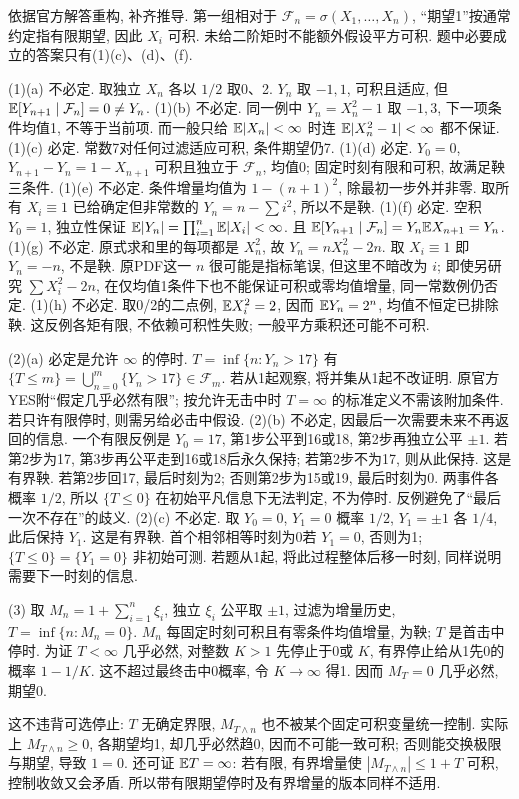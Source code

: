 \begin{solution}
依据官方解答重构, 补齐推导. 第一组相对于 $\mathcal F_n=\sigma(X_1,\ldots,X_n)$, ``期望1''按通常约定指有限期望, 因此 $X_i$ 可积. 未给二阶矩时不能额外假设平方可积. 题中必要成立的答案只有(1)(c)、(d)、(f).

(1)(a)\label{sol:flp-V-1-a} 不必定. 取独立 $X_n$ 各以 $1/2$ 取0、2. $Y_n$ 取 $-1,1$, 可积且适应, 但 $\mathbb E[Y_{n+1}\mid\mathcal F_n]=0\ne Y_n$.
(1)(b)\label{sol:flp-V-1-b} 不必定. 同一例中 $Y_n=X_n^2-1$ 取 $-1,3$, 下一项条件均值1, 不等于当前项. 而一般只给 $\mathbb E|X_n|<\infty$ 时连 $\mathbb E|X_n^2-1|<\infty$ 都不保证.
(1)(c)\label{sol:flp-V-1-c} 必定. 常数7对任何过滤适应可积, 条件期望仍7.
(1)(d)\label{sol:flp-V-1-d} 必定. $Y_0=0$, $Y_{n+1}-Y_n=1-X_{n+1}$ 可积且独立于 $\mathcal F_n$, 均值0; 固定时刻有限和可积, 故满足鞅三条件.
(1)(e)\label{sol:flp-V-1-e} 不必定. 条件增量均值为 $1-(n+1)^2$, 除最初一步外并非零. 取所有 $X_i\equiv1$ 已给确定但非常数的 $Y_n=n-\sum i^2$, 所以不是鞅.
(1)(f)\label{sol:flp-V-1-f} 必定. 空积 $Y_0=1$, 独立性保证 $\mathbb E|Y_n|=\prod_{i=1}^n\mathbb E|X_i|<\infty$. 且 $\mathbb E[Y_{n+1}\mid\mathcal F_n]=Y_n\mathbb E X_{n+1}=Y_n$.
(1)(g)\label{sol:flp-V-1-g} 不必定. 原式求和里的每项都是 $X_n^2$, 故 $Y_n=nX_n^2-2n$. 取 $X_i\equiv1$ 即 $Y_n=-n$, 不是鞅. 原PDF这一 $n$ 很可能是指标笔误, 但这里不暗改为 $i$; 即使另研究 $\sum X_i^2-2n$, 在仅均值1条件下也不能保证可积或零均值增量, 同一常数例仍否定.
(1)(h)\label{sol:flp-V-1-h} 不必定. 取0/2的二点例, $\mathbb E X_i^2=2$, 因而 $\mathbb E Y_n=2^n$, 均值不恒定已排除鞅. 这反例各矩有限, 不依赖可积性失败; 一般平方乘积还可能不可积.

(2)(a)\label{sol:flp-V-2-a} 必定是允许 $\infty$ 的停时. $T=\inf\{n:Y_n>17\}$ 有 $\{T\leq m\}=\bigcup_{n=0}^m\{Y_n>17\}\in\mathcal F_m$. 若从1起观察, 将并集从1起不改证明. 原官方YES附``假定几乎必然有限''; 按允许无击中时 $T=\infty$ 的标准定义不需该附加条件. 若只许有限停时, 则需另给必击中假设.
(2)(b)\label{sol:flp-V-2-b} 不必定, 因最后一次需要未来不再返回的信息. 一个有限反例是 $Y_0=17$, 第1步公平到16或18, 第2步再独立公平 $\pm1$. 若第2步为17, 第3步再公平走到16或18后永久保持; 若第2步不为17, 则从此保持. 这是有界鞅. 若第2步回17, 最后时刻为2; 否则第2步为15或19, 最后时刻为0. 两事件各概率 $1/2$, 所以 $\{T\leq0\}$ 在初始平凡信息下无法判定, 不为停时. 反例避免了``最后一次不存在''的歧义.
(2)(c)\label{sol:flp-V-2-c} 不必定. 取 $Y_0=0$, $Y_1=0$ 概率 $1/2$, $Y_1=\pm1$ 各 $1/4$, 此后保持 $Y_1$. 这是有界鞅. 首个相邻相等时刻为0若 $Y_1=0$, 否则为1; $\{T\leq0\}=\{Y_1=0\}$ 非初始可测. 若题从1起, 将此过程整体后移一时刻, 同样说明需要下一时刻的信息.

(3)\label{sol:flp-V-3} 取 $M_n=1+\sum_{i=1}^n\xi_i$, 独立 $\xi_i$ 公平取 $\pm1$, 过滤为增量历史, $T=\inf\{n:M_n=0\}$. $M_n$ 每固定时刻可积且有零条件均值增量, 为鞅; $T$ 是首击中停时. 为证 $T<\infty$ 几乎必然, 对整数 $K>1$ 先停止于0或 $K$, 有界停止给从1先0的概率 $1-1/K$. 这不超过最终击中0概率, 令 $K\to\infty$ 得1. 因而 $M_T=0$ 几乎必然, 期望0.

这不违背可选停止: $T$ 无确定界限, $M_{T\wedge n}$ 也不被某个固定可积变量统一控制. 实际上 $M_{T\wedge n}\geq0$, 各期望均1, 却几乎必然趋0, 因而不可能一致可积; 否则能交换极限与期望, 导致 $1=0$. 还可证 $\mathbb E T=\infty$: 若有限, 有界增量使 $|M_{T\wedge n}|\leq1+T$ 可积, 控制收敛又会矛盾. 所以带有限期望停时及有界增量的版本同样不适用.
\end{solution}

